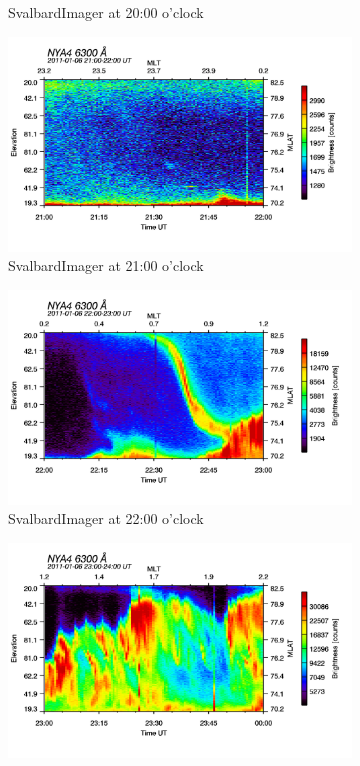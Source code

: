 \documentclass[10pt,a4paper]{article}
\begin{document}
\begin{figure}[h]
\begin{subfigure}{0.3\textwidth}
	\caption{ SvalbardImager at 20:00 o'clock \label{SBI_6_20}}
\end{subfigure}
\begin{subfigure}{0.3\textwidth}
\centering
	\includegraphics[width=\textwidth]{SvalbardImager6300A21.png}
	\caption{ SvalbardImager at 21:00 o'clock \label{SBI_6_21}}
\end{subfigure}
\begin{subfigure}{0.3\textwidth}
\centering
	\includegraphics[width=\textwidth]{SvalbardImager6300A22.png}
	\caption{ SvalbardImager at 22:00 o'clock \label{SBI_6_22}}
\end{subfigure}
\begin{subfigure}{0.3\textwidth}
\centering
	\includegraphics[width=\textwidth]{SvalbardImager6300A23.png}

\end{subfigure}
\end{figure}
\end{document}
